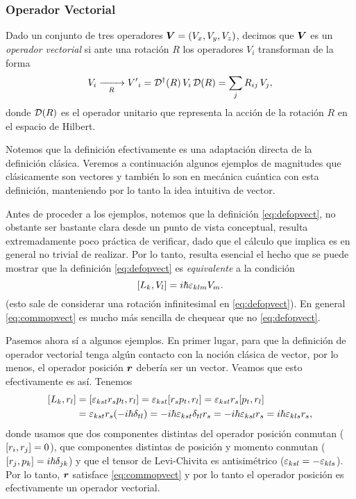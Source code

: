 \documentclass[10pt, a4paper]{article}
\numberwithin{equation}{subsection}
\begin{document}
\subsubsection{Operador Vectorial}
Dado un conjunto de tres operadores $\vb*{V} = (V_x, V_y, V_z)$, decimos que
$\vb*{V}$ es un \emph{operador vectorial} si ante una rotación $R$ los
operadores $V_i$ transforman de la forma
\begin{equation} \label{eq:defopvect}
  V_i \xrightarrow[R]{\qquad} {V'}_i =
  \RotationOp^\dagger(R)\,V_i\,\RotationOp(R) = \sum_j R_{ij}\,V_j,
\end{equation}
donde $\RotationOp(R)$ es el operador unitario que representa la acción de la
rotación $R$ en el espacio de Hilbert.

Notemos que la definición efectivamente es una adaptación directa de la
definición clásica. Veremos a continuación algunos ejemplos de magnitudes que
clásicamente son vectores y también lo son en mecánica cuántica con esta
definición, manteniendo por lo tanto la idea intuitiva de vector.

Antes de proceder a los ejemplos, notemos que la definición
\eqref{eq:defopvect}, no obstante ser bastante clara desde un punto de vista
conceptual, resulta extremadamente poco práctica de verificar, dado que el
cálculo que implica es en general no trivial de realizar. Por lo tanto, resulta
esencial el hecho que se puede mostrar que la definición \eqref{eq:defopvect}
es \emph{equivalente} a la condición
\begin{equation} \label{eq:commopvect}
  \comm{L_k}{V_l} = i\hbar\lchivita_{klm}V_m.
\end{equation}
(esto sale de considerar una rotación infinitesimal en \eqref{eq:defopvect}).
En general \eqref{eq:commopvect} es mucho más sencilla de chequear que no
\eqref{eq:defopvect}.

Pasemos ahora sí a algunos ejemplos. En primer lugar, para que la definición de
operador vectorial tenga algún contacto con la noción clásica de vector, por lo
menos, el operador posición $\vb*{r}$ debería ser un vector. Veamos que esto
efectivamente es así. Tenemos
\begin{align}
  \comm{L_k}{r_l} &= \comm{\lchivita_{kst}r_sp_t}{r_l} =
  \lchivita_{kst}\comm{r_sp_t}{r_l} =
  \lchivita_{kst}r_s\comm{p_t}{r_l} \nonumber \\
  &= \lchivita_{kst}r_s(-i\hbar\delta_{tl}) =
  -i\hbar\lchivita_{kst}\delta_{tl}r_s =
  -i\hbar\lchivita_{ksl}r_s =
  i\hbar\lchivita_{kls}r_s,
\end{align}
donde usamos que dos componentes distintas del operador posición conmutan
($\comm{r_i}{r_j} = 0$), que componentes distintas de posición y momento
conmutan ($\comm{r_j}{p_k} = i\hbar\delta_{jk}$) y que el tensor de
Levi-Chivita es antisimétrico ($\varepsilon_{ksl} = -\varepsilon_{kls}$).
Por lo tanto, $\vb*{r}$ satisface \eqref{eq:commopvect} y por lo tanto el
operador posición es efectivamente un operador vectorial.
\end{document}
